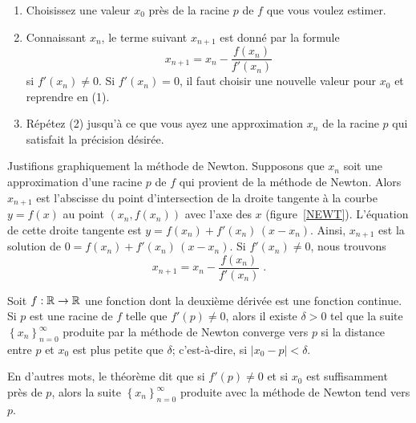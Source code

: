 {\begin{meth} 
\begin{enumerate}
\item Choisissez une valeur $x_0$ près de la racine $p$ de $f$ que vous
voulez estimer.
\item Connaissant $x_n$, le terme suivant $x_{n+1}$ est donné par la
formule
\begin{equation} \label{newt_form}
x_{n+1}=x_n-\frac{f(x_n)}{f'(x_n)}
\end{equation}
si $f'(x_n)\neq 0$.  Si $f'(x_n)=0$, il faut choisir une nouvelle valeur pour
$x_0$ et reprendre en (1).
\item Répétez (2) jusqu'à ce que vous ayez une approximation $x_n$ de
la racine $p$ qui satisfait la précision désirée.
\end{enumerate}
\end{meth}

Justifions graphiquement la méthode de Newton.  Supposons que
$x_n$ soit une approximation d'une racine $p$ de $f$ qui provient de
la méthode de Newton.  Alors $x_{n+1}$ est l'abscisse du point
d'intersection de la droite tangente à la courbe $y=f(x)$ au point
$(x_n,f(x_n))$ avec l'axe des $x$ (figure~\ref{NEWT}).
L'équation de cette droite tangente est $y=f(x_n)+f'(x_n)\,(x-x_n)$.
Ainsi, $x_{n+1}$ est la solution de $0 = f(x_n)+f'(x_n)\,(x-x_n)$.  Si
$f'(x_n)\not=0$, nous trouvons
\[
x_{n+1} = x_n-\frac{f(x_n)}{f'(x_n)} \; .
\]


\begin{theorem}[+\theory]
Soit $f:\mathbb{R}\rightarrow \mathbb{R}$ une fonction dont la deuxième
dérivée est une fonction continue.  Si $p$ est une racine de $f$
telle que $f'(p) \neq 0$, alors il existe $\delta > 0$ tel que la
suite $\displaystyle \left\{x_n\right\}_{n=0}^\infty$ produite par la
méthode de Newton converge vers $p$ si la distance entre $p$ et $x_0$
est plus petite que $\delta$; c'est-à-dire, si $|x_0-p|<\delta$.
\end{theorem}

\begin{rmk}[\theory]
En d'autres mots, le théorème dit que si $f'(p)\neq 0$ et si $x_0$ est
suffisamment près de $p$, alors la suite
$\displaystyle \left\{x_n\right\}_{n=0}^\infty$ produite avec la
méthode de Newton tend vers $p$.


\end{rmk}}
